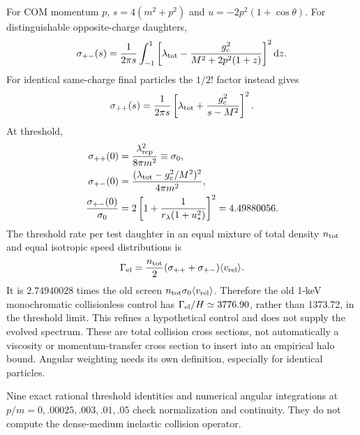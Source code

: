 \documentclass[11pt]{article}
\newcommand{\dd}{\mathrm d}
\newcommand{\lt}{\lambda_{\rm tot}}
\begin{document}
For COM momentum $p$, $s=4(m^2+p^2)$ and
$u=-2p^2(1+\cos\theta)$. For distinguishable opposite-charge daughters,
\begin{equation}
 \sigma_{+-}(s)=\frac{1}{2\pi s}\int_{-1}^1
 \left[\lt-\frac{g_c^2}{M^2+2p^2(1+z)}\right]^2\dd z.
\end{equation}
For identical same-charge final particles the $1/2!$ factor instead gives
\begin{equation}
 \sigma_{++}(s)=\frac{1}{2\pi s}
 \left[\lt+\frac{g_c^2}{s-M^2}\right]^2.
\end{equation}
At threshold,
\begin{align}
 \sigma_{++}(0)&=\frac{\lambda_{\rm rep}^2}{8\pi m^2}\equiv\sigma_0,\\
 \sigma_{+-}(0)&=\frac{(\lt-g_c^2/M^2)^2}{4\pi m^2},\\
 \frac{\sigma_{+-}(0)}{\sigma_0}
 &=2\left[1+\frac{1}{r_\lambda(1+u_*^2)}\right]^2=4.49880056.
\end{align}
The threshold rate per test daughter in an equal mixture of total density
$n_{\rm tot}$ and equal isotropic speed distributions is
\begin{equation}
 \Gamma_{\rm el}=\frac{n_{\rm tot}}{2}
 (\sigma_{++}+\sigma_{+-})\langle v_{\rm rel}\rangle.
\end{equation}
It is $2.74940028$ times the old screen $n_{\rm tot}\sigma_0
\langle v_{\rm rel}\rangle$. Therefore the old 1-keV monochromatic
collisionless control has $\Gamma_{\rm el}/H\simeq3776.90$, rather than
1373.72, in the threshold limit. This refines a hypothetical control and
does not supply the evolved spectrum. These are total collision cross
sections, not automatically a viscosity or momentum-transfer cross section
to insert into an empirical halo bound. Angular weighting needs its own
definition, especially for identical particles.

Nine exact rational threshold identities and numerical angular integrations
at $p/m=0,.00025,.003,.01,.05$ check normalization and continuity. They do
not compute the dense-medium inelastic collision operator.
\end{document}
